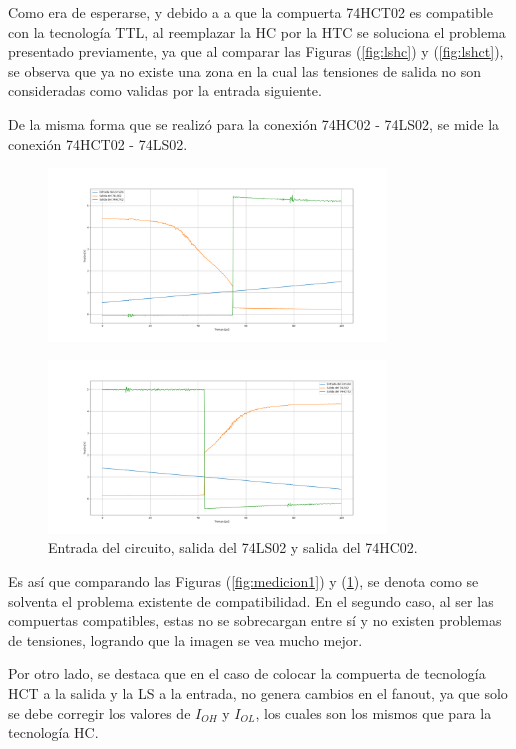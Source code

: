 Como era de esperarse, y debido a a que la compuerta 74HCT02 es compatible con la tecnología TTL, al reemplazar la HC por la HTC se soluciona el problema presentado previamente, ya que al comparar las Figuras (\ref{fig:lshc}) y (\ref{fig:lshct}), se observa que ya no existe una zona en la cual las tensiones de salida no son consideradas como validas por la entrada siguiente.

De la misma forma que se realizó para la conexión 74HC02 - 74LS02, se mide la conexión 74HCT02 - 74LS02.
\begin{figure}[H]
\centering
	\includegraphics[width=0.8\textwidth]{ImagenesEjercicio2/scope_23_1.png}
\end{figure}
\begin{figure}[H]
\centering
	\includegraphics[width=0.8\textwidth]{ImagenesEjercicio2/scope_26_1.png}
\caption{Entrada del circuito, salida del 74LS02 y salida del 74HC02.}
\label{fig:medicion2}
\end{figure} 

Es así que comparando las Figuras (\ref{fig:medicion1}) y (\ref{fig:medicion2}), se denota como se solventa el problema existente de compatibilidad. En el segundo caso, al ser las compuertas compatibles, estas no se sobrecargan entre sí y no existen problemas de tensiones, logrando que la imagen se vea mucho mejor.

Por otro lado, se destaca que en el caso de colocar la compuerta de tecnología HCT a la salida y la LS a la entrada, no genera cambios en el fanout, ya que solo se debe corregir los valores de $I_{OH}$ y $I_{OL}$, los cuales son los mismos que para la tecnología HC.

